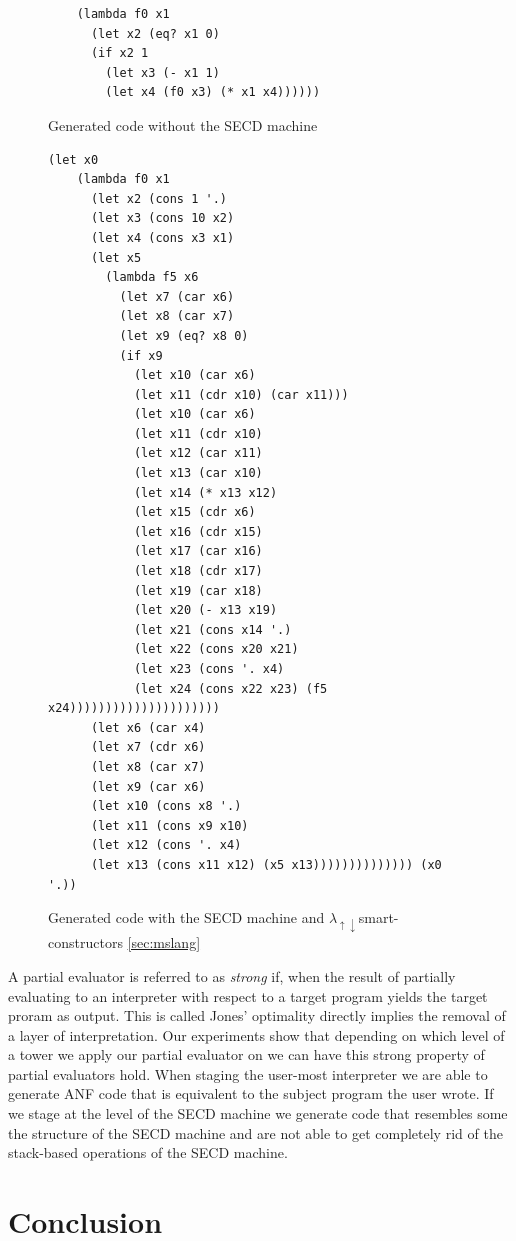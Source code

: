 \documentclass{article}
\theoremstyle{definition}
\newcommand{\mslang}{$\lambda_{\uparrow\downarrow}$}
\begin{document}
\begin{figure}[ht]
\centering
\begin{verbatim}
	(lambda f0 x1
	  (let x2 (eq? x1 0)
	  (if x2 1
		(let x3 (- x1 1)
		(let x4 (f0 x3) (* x1 x4))))))
\end{verbatim}
\caption{Generated code without the SECD machine}
\label{lst:pink_factorial}
\end{figure}

\begin{figure}[ht]
\centering
\begin{verbatim}
(let x0
	(lambda f0 x1
	  (let x2 (cons 1 '.)
	  (let x3 (cons 10 x2)
	  (let x4 (cons x3 x1)
	  (let x5
		(lambda f5 x6
		  (let x7 (car x6)
		  (let x8 (car x7)
		  (let x9 (eq? x8 0)
		  (if x9
			(let x10 (car x6)
			(let x11 (cdr x10) (car x11)))
			(let x10 (car x6)
			(let x11 (cdr x10)
			(let x12 (car x11)
			(let x13 (car x10)
			(let x14 (* x13 x12)
			(let x15 (cdr x6)
			(let x16 (cdr x15)
			(let x17 (car x16)
			(let x18 (cdr x17)
			(let x19 (car x18)
			(let x20 (- x13 x19)
			(let x21 (cons x14 '.)
			(let x22 (cons x20 x21)
			(let x23 (cons '. x4)
			(let x24 (cons x22 x23) (f5 x24)))))))))))))))))))))
	  (let x6 (car x4)
	  (let x7 (cdr x6)
	  (let x8 (car x7)
	  (let x9 (car x6)
	  (let x10 (cons x8 '.)
	  (let x11 (cons x9 x10)
	  (let x12 (cons '. x4)
	  (let x13 (cons x11 x12) (x5 x13)))))))))))))) (x0 '.))
\end{verbatim}
\caption{Generated code with the SECD machine and \mslang smart-constructors \ref{sec:mslang}}
\label{lst:secd_factorial}
\end{figure}

A partial evaluator is referred to as \textit{strong} if, when the result of partially evaluating to an interpreter with respect to a target program yields the target proram as output. This is called Jones' optimality directly implies the removal of a layer of interpretation. Our experiments show that depending on which level of a tower we apply our partial evaluator on we can have this strong property of partial evaluators hold. When staging the user-most interpreter we are able to generate ANF code that is equivalent to the subject program the user wrote. If we stage at the level of the SECD machine we generate code that resembles some the structure of the SECD machine and are not able to get completely rid of the stack-based operations of the SECD machine.

\section{Conclusion}
\end{document}
